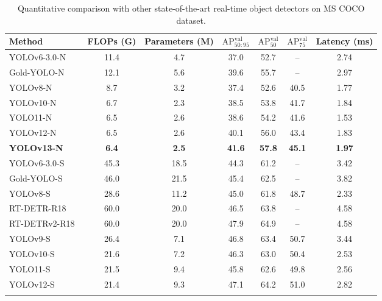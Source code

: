 \begin{table*}[t]
\centering
\caption{Quantitative comparison with other state-of-the-art real-time object detectors on MS COCO dataset.}
\vspace{-0.2cm}
\label{tab:coco_compare}
\renewcommand{\arraystretch}{1.}
\setlength{\tabcolsep}{5.8mm}
\begin{tabular}{lcccccc}
\toprule
\textbf{Method} & \textbf{FLOPs (G)} & \textbf{Parameters (M)} & \textbf{$\text{AP}_{50:95}^\text{val}$} & \textbf{$\text{AP}_{50}^\text{val}$} & \textbf{$\text{AP}_{75}^\text{val}$} & \textbf{Latency (ms)} \\ \midrule
YOLOv6-3.0-N~\cite{yolov6}        & 11.4  & 4.7  & 37.0  & 52.7  & –    & 2.74\\
Gold-YOLO-N~\cite{goldyolo}        & 12.1  & 5.6  & 39.6  & 55.7  & –    & 2.97\\
YOLOv8-N~\cite{yolov8}            & 8.7   & 3.2  & 37.4  & 52.6  & 40.5 & 1.77\\
YOLOv10-N~\cite{yolov10}           & 6.7& 2.3& 38.5& 53.8& 41.7& 1.84\\
YOLO11-N~\cite{yolo11}            & 6.5   & 2.6  & 38.6  & 54.2  & 41.6 & 1.53\\
YOLOv12-N~\cite{yolov12}           & 6.5   & 2.6  & 40.1  & 56.0  & 43.4 & 1.83\\\rowcolor{blue!10}
\textbf{YOLOv13-N}& \textbf{6.4}   & \textbf{2.5}  & \textbf{41.6} & \textbf{57.8} & \textbf{45.1} & \textbf{1.97}\\ \midrule
YOLOv6-3.0-S~\cite{yolov6}        & 45.3  & 18.5 & 44.3  & 61.2  & –    & 3.42\\
Gold-YOLO-S~\cite{goldyolo} & 46.0  & 21.5 & 45.4  & 62.5  & –    & 3.82\\
YOLOv8-S~\cite{yolov8}            & 28.6  & 11.2 & 45.0  & 61.8  & 48.7 & 2.33\\
RT-DETR-R18~\cite{rt_detr}         & 60.0  & 20.0 & 46.5  & 63.8  & –    & 4.58\\
RT-DETRv2-R18~\cite{rt_detrv2}       & 60.0  & 20.0 & 47.9  & 64.9  & –    & 4.58\\
YOLOv9-S~\cite{yolov9}            & 26.4  & 7.1  & 46.8  & 63.4  & 50.7 & 3.44\\
YOLOv10-S~\cite{yolov10}           & 21.6  & 7.2  & 46.3& 63.0& 50.4& 2.53\\
YOLO11-S~\cite{yolo11}            & 21.5  & 9.4  & 45.8  & 62.6  & 49.8 & 2.56\\
YOLOv12-S~\cite{yolov12}           & 21.4  & 9.3  & 47.1  & 64.2  & 51.0 & 2.82\\ \rowcolor{blue!10}

\end{tabular}
\end{table*}
